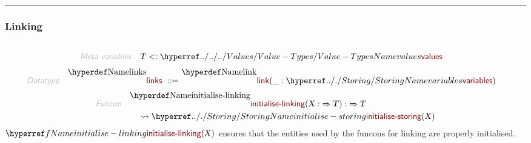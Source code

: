

\begin{center}
\rule{3in}{0.4pt}
\end{center}

\subsubsection{Linking}\hypertarget{linking}{}\label{linking}

\begin{align*}
  [ \
  \KEY{Datatype} \quad & \NAMEREF{links} \\
  \KEY{Funcon} \quad & \NAMEREF{initialise-linking} \\
  \KEY{Funcon} \quad & \NAMEREF{link} \\
  \KEY{Funcon} \quad & \NAMEREF{fresh-link} \\
  \KEY{Funcon} \quad & \NAMEREF{fresh-initialised-link} \\
  \KEY{Alias} \quad & \NAMEREF{fresh-init-link} \\
  \KEY{Funcon} \quad & \NAMEREF{set-link} \\
  \KEY{Funcon} \quad & \NAMEREF{follow-if-link}
  \ ]
\end{align*}
\begin{align*}
  \KEY{Meta-variables} \quad
  & \VAR{T} <: \NAMEHYPER{../../../Values}{Value-Types}{values}
\end{align*}
\begin{align*}
  \KEY{Datatype} \quad 
  \NAMEDECL{links} 
  \ ::= \ & \NAMEDECL{link}(
                               \_ : \NAMEHYPER{../.}{Storing}{variables})
\end{align*}
\begin{align*}
  \KEY{Funcon} \quad
  & \NAMEDECL{initialise-linking}(
                       \VAR{X} :  \TO \VAR{T}) 
    :  \TO \VAR{T} \\&\quad
    \leadsto \NAMEHYPER{../.}{Storing}{initialise-storing}
               (  \VAR{X} )
\end{align*}
$\SHADE{\NAMEREF{initialise-linking}
           (  \VAR{X} )}$ ensures that the entities used by the funcons for
  linking are properly initialised.

